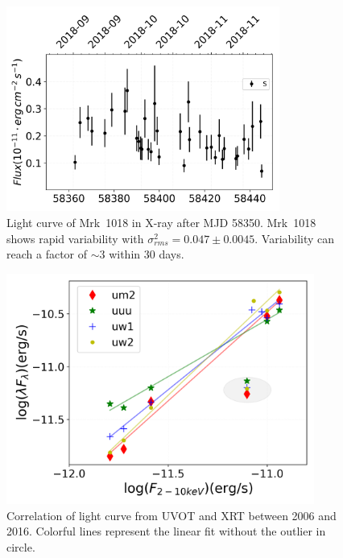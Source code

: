 \documentclass[twocolumn]{aastex63}
\begin{document}
\begin{figure}
\centering
	\includegraphics[width=0.8\textwidth]{./pic/subplots-xrt_uvot-radio-second-right-part.png}
    \caption{Light curve of Mrk~1018 in X-ray after MJD 58350. Mrk~1018 shows rapid variability with $\sigma^2_{rms} = 0.047 \pm 0.0045 $. Variability can reach a factor of $\sim3$ within 30 days.}
    \label{fig:x-ray-lc-rp-secondaxis}
\end{figure}


\begin{figure}
\centering
	\includegraphics[width=0.9\textwidth]{./pic/uvot_xrt_correlation-fig-without-outlier.png}
    \caption{Correlation of light curve from UVOT and XRT  between 2006 and 2016. Colorful lines represent the linear fit without the outlier in circle.}
    \label{fig:correlation-uvot-xray}
\end{figure}
\end{document}
